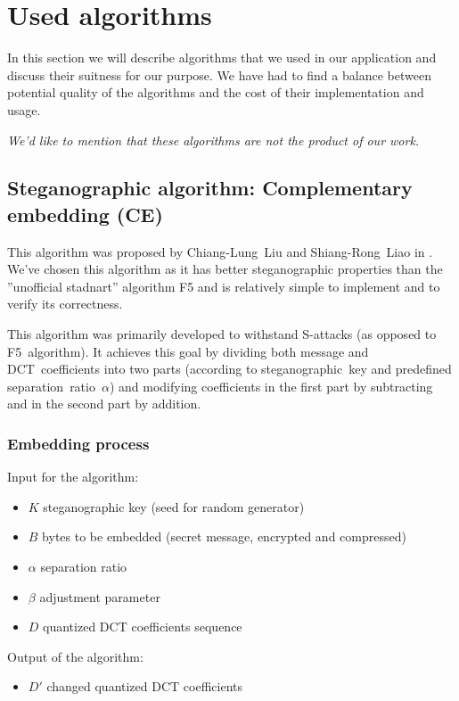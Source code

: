 \section{Used algorithms}
In this section we will describe algorithms that we used in our application
and discuss their suitness for our purpose. 
We have had to find a balance between potential quality of the algorithms 
and the cost of their implementation and usage.

\textit{We'd like to mention that these algorithms are not the product of our work.}

\subsection{Steganographic algorithm: Complementary embedding (CE)}
\label{ssec:ce}

This algorithm was proposed by Chiang-Lung~Liu and Shiang-Rong~Liao in \cite{liu2008high}.
We've chosen this algorithm as it has better steganographic properties than the ''unofficial
stadnart'' algorithm F5 and is relatively simple to implement and to verify its correctness.

This algorithm was primarily developed to withstand S-attacks (as opposed to F5~algorithm).
It achieves this goal by dividing both message and DCT~coefficients into two parts
(according to steganographic~key and predefined separation~ratio~$\alpha$) and
modifying coefficients in the first part by subtracting and in the second part by addition.

\subsubsection{Embedding process}
\label{sssec:therory-embedding}
Input for the algorithm:

\begin{itemize}
    \item $K$ steganographic key (seed for random generator)
    \item $B$ bytes to be embedded (secret message, encrypted and compressed)
    \item $\alpha$ separation ratio
    \item $\beta$ adjustment parameter
    \item $D$ quantized DCT coefficients sequence
\end{itemize}

Output of the algorithm:

\begin{itemize}
    \item $D'$ changed quantized DCT coefficients
\end{itemize}

